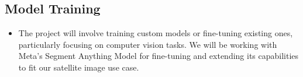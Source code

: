 \documentclass{article}
\begin{document}
   \subsection{Model Training}
  \begin{itemize}
      \item The project will involve training custom models or fine-tuning existing ones, particularly focusing on computer vision tasks. We will be working with Meta’s Segment Anything Model for fine-tuning and extending its capabilities to fit our satellite image use case.

  \end{itemize}
  




\end{document}
